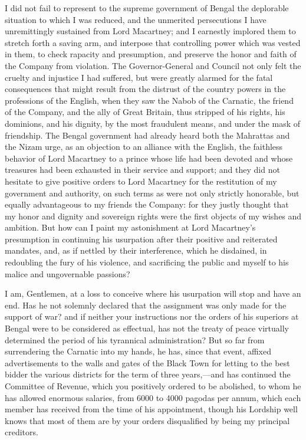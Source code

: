 I did not fail to represent to the supreme government of Bengal the deplorable situation to which I was reduced, and the unmerited persecutions I have unremittingly sustained from Lord Macartney; and I earnestly implored them to stretch forth a saving arm, and interpose that controlling power which was vested in them, to check rapacity and presumption, and preserve the honor and faith of the Company from violation. The Governor-General and Council not only felt the cruelty and injustice I had suffered, but were greatly alarmed for the fatal consequences that might result from the distrust of the country powers in the professions of the English, when they saw the Nabob of the Carnatic, the friend of the Company, and the ally of Great Britain, thus stripped of his rights, his dominions, and his dignity, by the most fraudulent means, and under the mask of friendship. The Bengal government had already heard both the Mahrattas and the Nizam urge, as an objection to an alliance with the English, the faithless behavior of Lord Macartney to a prince whose life had been devoted and whose treasures had been exhausted in their service and support; and they did not hesitate to give positive orders to Lord Macartney for the restitution of my government and authority, on such terms as were not only strictly honorable, but equally advantageous to my friends the Company: for they justly thought that my honor and dignity and sovereign rights were the first objects of my wishes and ambition. But how can I paint my astonishment at Lord Macartney's presumption in continuing his usurpation after their positive and reiterated mandates, and, as if nettled by their interference, which he disdained, in redoubling the fury of his violence, and sacrificing the public and myself to his malice and ungovernable passions?

I am, Gentlemen, at a loss to conceive where his usurpation will stop and have an end. Has he not solemnly declared that the assignment was only made for the support of war? and if neither your instructions nor the orders of his superiors at Bengal were to be considered as effectual, has not the treaty of peace virtually determined the period of his tyrannical administration? But so far from surrendering the Carnatic into my hands, he has, since that event, affixed advertisements to the walls and gates of the Black Town for letting to the best bidder the various districts for the term of three years,—and has continued the Committee of Revenue, which you positively ordered to be abolished, to whom he has allowed enormous salaries, from 6000 to 4000 pagodas per annum, which each member has received from the time of his appointment, though his Lordship well knows that most of them are by your orders disqualified by being my principal creditors.


